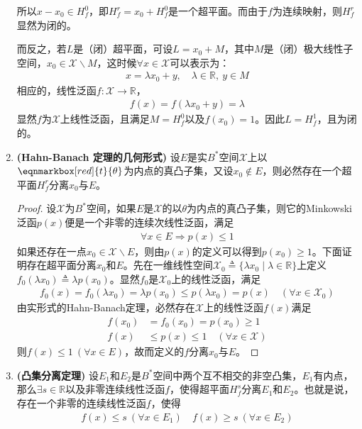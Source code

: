 \begin{enumerate}[leftmargin=2cm, label=\arabic*]
		所以$x-x_0\in H_f^0$，即$H_f^r = x_0 + H_f^0$是一个超平面。而由于$f$为连续映射，则$H_f^r$显然为闭的。
		
		而反之，若$L$是（闭）超平面，可设$L = x_0 + M$，其中$M$是（闭）极大线性子空间，$x_0\in\mathscr{X}\backslash M$，这时候$\forall x\in\mathscr{X}$可以表示为：
		\begin{align*}
			x = \lambda x_0 + y,\quad \lambda\in\mathbb{R},\ y\in M
		\end{align*}
		相应的，线性泛函$f:\mathscr{X}\to\mathbb{R}$，
		\begin{align*}
			f(x) = f(\lambda x_0 + y) = \lambda
		\end{align*}
		显然$f$为$\mathscr{X}$上线性泛函，且满足$M = H_f^0$以及$f(x_0) = 1$。因此$L = H_f^1$，且为闭的。
		\item \textbf{(Hahn-Banach 定理的几何形式)} 设$E$是实$B^*$空间$\mathscr{X}$上以$\eqnmarkbox[red]{t}{\theta}$为内点的真凸子集，又设$x_0\notin E$，则必然存在一个超平面$H_f^r$分离$x_0$与$E$。
		\vspace{1.0em}
		
		\begin{proof}
			设$\mathscr{X}$为$B^*$空间，如果$E$是$\mathscr{X}$的以$\theta$为内点的真凸子集，则它的Minkowski泛函$p(x)$便是一个非零的连续次线性泛函，满足
			\begin{align*}
				\forall x\in E\Longrightarrow p(x)\leqslant 1
			\end{align*}
			如果还存在一点$x_0\in\mathscr{X}\backslash E$，则由$p(x)$的定义可以得到$p(x_0)\geqslant 1$。下面证明存在超平面分离$x_0$和$E$。先在一维线性空间$\mathscr{X}_0 \triangleq \{\lambda x_0\mid \lambda\in\mathbb{R}\}$上定义$f_0(\lambda x_0) \triangleq \lambda p(x_0)$。显然$f_0$是$\mathscr{X}_0$上的线性泛函，满足
			\begin{align*}
				f_0(x) = f_0(\lambda x_0) = \lambda p(x_0) \leqslant p(\lambda x_0) = p(x) \quad (\forall x\in\mathscr{X}_0)
			\end{align*}
			由实形式的Hahn-Banach定理，必然存在$\mathscr{X}$上的线性泛函$f(x)$满足
			\begin{align*}
				f(x_0) &= f_0(x_0) = p(x_0)\geqslant 1\\
				f(x) &\leqslant p(x)\leqslant 1 \quad (\forall x\in\mathscr{X})
			\end{align*}
			则$f(x)\leqslant 1\ (\forall x\in E)$，故而定义的$f$分离$x_0$与$E$。
		\end{proof}
		\item \textbf{(凸集分离定理)} 设$E_1$和$E_2$是$B^*$空间中两个互不相交的非空凸集，$E_1$有内点，那么$\exists s\in\mathbb{R}$以及非零连续线性泛函$f$，使得超平面$H_f^s$分离$E_1$和$E_2$。也就是说，存在一个非零的连续线性泛函$f$，使得
		\begin{align*}
			f(x)\leqslant s\ (\forall x\in E_1) \quad f(x)\geqslant s\ (\forall x\in E_2)
		\end{align*}
		

\end{enumerate}
